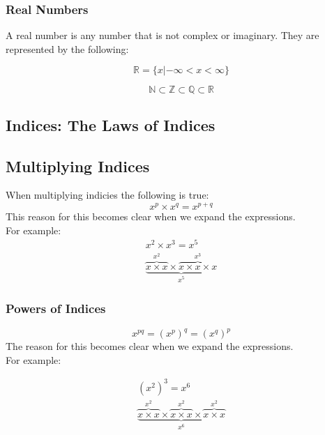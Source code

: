 \documentclass{article}
\begin{document}
\subsubsection{Real Numbers}
A real number is any number that is not complex or imaginary. They are represented by the following:

\begin{equation}
	\label{simple_equation}
	\mathbb{R} = \{x | -\infty <  x <\infty\}
\end{equation}

\begin{equation}
	\label{simple_equation}
	\mathbb{N} \subset \mathbb{Z} \subset \mathbb{Q} \subset \mathbb{R}
\end{equation}

\break
\subsection{Indices: The Laws of Indices}

\subsection{Multiplying Indices}
When multiplying indicies the following is true:
\begin{equation}
	\label{simple_equation}
	x^{p} \times x^{q} = x^{p + q}
\end{equation}
This reason for this becomes clear when we expand the expressions.
\\
For example:
\begin{gather*}
	x^2 \times x^3 = x^5\\
	\underbrace{
		\overbrace{x \times x}^{x^2} \times
		\overbrace{x \times x \times x}^{x^3}
	}_{x^5}
\end{gather*}

\subsubsection{Powers of Indices}

\begin{equation}
	\label{simple_equation}
	x^{pq} = (x^{p})^{q} = (x^{q})^{p} 
\end{equation}
The reason for this becomes clear when we expand the expressions.
\\
For example:

\begin{gather*}
	(x^2)^3 = x^6\\
	\underbrace{
		\overbrace{x \times x}^{x^2} \times
		\overbrace{x \times x}^{x^2} \times
		\overbrace{x \times x}^{x^2}
	}_{x^6}
\end{gather*}
\end{document}

